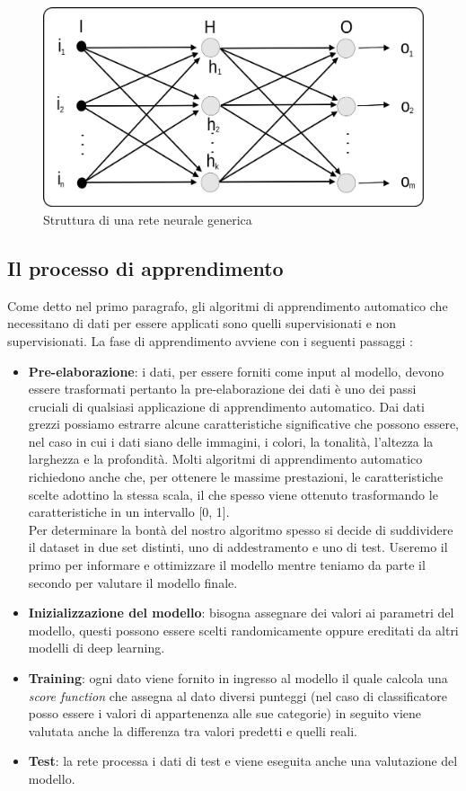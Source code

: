 \begin{figure}
	\centering
	\includegraphics[width=0.8\linewidth]{../immagini/ReteNeu}
	\caption[Rete Neurale]{Struttura di una rete neurale generica }
	\label{fig:reteneu}
\end{figure}
\subsection{Il processo di apprendimento}
Come detto nel primo paragrafo, gli algoritmi di apprendimento automatico che necessitano di dati per essere applicati sono quelli supervisionati e non supervisionati. La fase di apprendimento avviene con i seguenti passaggi \cite{ML}: 
\begin{itemize}
	\item \textbf{Pre-elaborazione}: i dati, per essere forniti come input al modello, devono essere trasformati pertanto la pre-elaborazione dei dati è uno dei passi cruciali di qualsiasi applicazione di apprendimento automatico. Dai dati grezzi possiamo estrarre alcune caratteristiche significative che possono essere, nel caso in cui i dati siano delle immagini, i colori, la tonalità, l'altezza la larghezza e la profondità. Molti algoritmi di apprendimento automatico richiedono anche che, per ottenere le massime prestazioni, le caratteristiche scelte adottino la stessa scala, il che spesso viene ottenuto trasformando le caratteristiche in un intervallo [0, 1]. \\
	Per determinare	la bontà del nostro algoritmo spesso si decide di suddividere il dataset in due set distinti, uno di addestramento e uno di test. Useremo il primo per informare e ottimizzare il modello mentre teniamo da parte il secondo per valutare il modello finale.
	\item \textbf{Inizializzazione del modello}: bisogna assegnare dei valori ai parametri del modello, questi possono essere scelti randomicamente oppure ereditati da altri modelli di deep learning.  
	\item \textbf{Training}: ogni dato viene fornito in ingresso al modello il quale calcola una \textit{score function} che assegna al dato diversi punteggi (nel caso di classificatore posso essere i valori di appartenenza alle sue categorie) in seguito viene valutata anche la differenza tra valori predetti e quelli reali.
	\item \textbf{Test}: la rete processa i dati di test e viene eseguita anche una valutazione del modello. 
\end{itemize}
